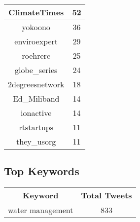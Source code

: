 \documentclass{article}\usepackage[T1]{fontenc}
\begin{document}
\begin{tabular}{|c|c|}
 \hline
ClimateTimes & 52\\ 
 \hline
yokoono & 36\\ 
 \hline
enviroexpert & 29\\ 
 \hline
roehrerc & 25\\ 
 \hline
globe\_series & 24\\ 
 \hline
2degreesnetwork & 18\\ 
 \hline
Ed\_Miliband & 14\\ 
 \hline
ionactive & 14\\ 
 \hline
rtstartups & 11\\ 
 \hline
they\_usorg & 11\\ 
 \hline
\end{tabular}\subsection*{Top Keywords}\begin{tabular}{|c|c|}         \hline         Keyword & Total Tweets \\ 
 \hline
water management & 833\\ 
 \hline
\end{tabular}
\end{document}
